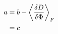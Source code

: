 \documentclass{article}
\begin{document}
\begin{equation}\begin{aligned}
a & = b - \expval{\delta D \over \delta \Phi}_F \\
 & = c
\end{aligned}\end{equation}
\end{document}
